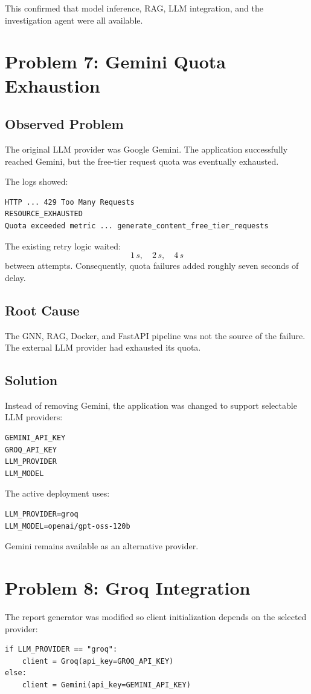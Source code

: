 \documentclass[11pt,a4paper]{article}
\begin{document}
This confirmed that model inference, RAG, LLM integration, and the investigation agent were all available.

\section{Problem 7: Gemini Quota Exhaustion}
\subsection{Observed Problem}
The original LLM provider was Google Gemini. The application successfully reached Gemini, but the free-tier request quota was eventually exhausted.

The logs showed:
\begin{lstlisting}
HTTP ... 429 Too Many Requests
RESOURCE_EXHAUSTED
Quota exceeded metric ... generate_content_free_tier_requests
\end{lstlisting}

The existing retry logic waited:
\[
1\,s,\quad 2\,s,\quad 4\,s
\]
between attempts. Consequently, quota failures added roughly seven seconds of delay.

\subsection{Root Cause}
The GNN, RAG, Docker, and FastAPI pipeline was not the source of the failure. The external LLM provider had exhausted its quota.

\subsection{Solution}
Instead of removing Gemini, the application was changed to support selectable LLM providers:
\begin{lstlisting}
GEMINI_API_KEY
GROQ_API_KEY
LLM_PROVIDER
LLM_MODEL
\end{lstlisting}

The active deployment uses:
\begin{lstlisting}
LLM_PROVIDER=groq
LLM_MODEL=openai/gpt-oss-120b
\end{lstlisting}

Gemini remains available as an alternative provider.

\section{Problem 8: Groq Integration}
The report generator was modified so client initialization depends on the selected provider:
\begin{lstlisting}
if LLM_PROVIDER == "groq":
    client = Groq(api_key=GROQ_API_KEY)
else:
    client = Gemini(api_key=GEMINI_API_KEY)
\end{lstlisting}
\end{document}
